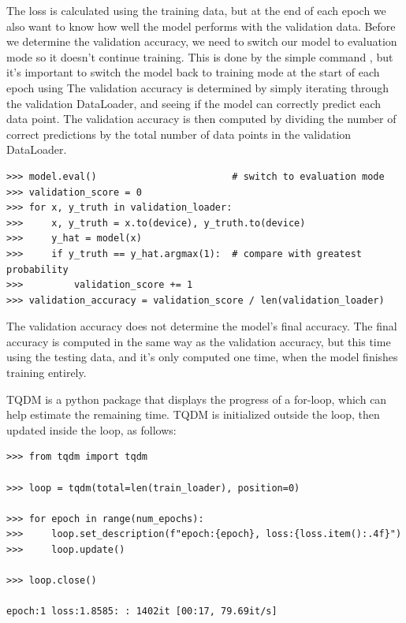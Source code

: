 The loss is calculated using the training data, but at the end of each epoch we also want to know how well the model performs with the validation data.
Before we determine the validation accuracy, we need to switch our model to evaluation mode so it doesn't continue training.
This is done by the simple command , but it's important to switch the model back to training mode at the start of each epoch using 
The validation accuracy is determined by simply iterating through the validation DataLoader, and seeing if the model can correctly predict each data point.
The validation accuracy is then computed by dividing the number of correct predictions by the total number of data points in the validation DataLoader.
\begin{lstlisting}
>>> model.eval()                        # switch to evaluation mode
>>> validation_score = 0
>>> for x, y_truth in validation_loader:
>>>     x, y_truth = x.to(device), y_truth.to(device)
>>>     y_hat = model(x)
>>>     if y_truth == y_hat.argmax(1):  # compare with greatest probability
>>>         validation_score += 1
>>> validation_accuracy = validation_score / len(validation_loader)
\end{lstlisting}
The validation accuracy does not determine the model's final accuracy.
The final accuracy is computed in the same way as the validation accuracy, but this time using the testing data, and it's only computed one time, when the model finishes training entirely.

TQDM is a python package that displays the progress of a for-loop, which can help estimate the remaining time.
TQDM is initialized outside the loop, then updated inside the loop, as follows:

\begin{lstlisting}
>>> from tqdm import tqdm

>>> loop = tqdm(total=len(train_loader), position=0)

>>> for epoch in range(num_epochs):
>>>     loop.set_description(f"epoch:{epoch}, loss:{loss.item():.4f}")
>>>		loop.update()

>>> loop.close()

epoch:1 loss:1.8585: : 1402it [00:17, 79.69it/s]
\end{lstlisting}

